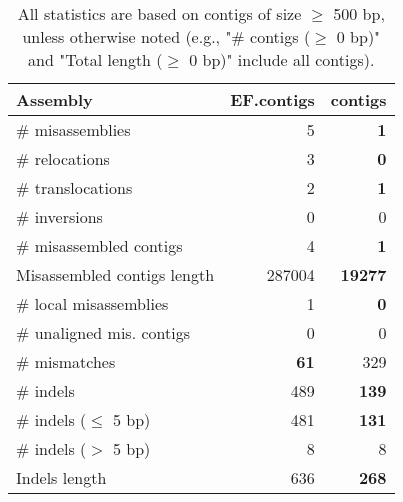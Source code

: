 \documentclass[12pt,a4paper]{article}
\begin{document}
\begin{table}[ht]
\begin{center}
\caption{All statistics are based on contigs of size $\geq$ 500 bp, unless otherwise noted (e.g., "\# contigs ($\geq$ 0 bp)" and "Total length ($\geq$ 0 bp)" include all contigs).}
\begin{tabular}{|l*{2}{|r}|}
\hline
Assembly & EF.contigs & contigs \\ \hline
\# misassemblies & 5 & {\bf 1} \\ \hline
\hspace{5mm}\# relocations & 3 & {\bf 0} \\ \hline
\hspace{5mm}\# translocations & 2 & {\bf 1} \\ \hline
\hspace{5mm}\# inversions & 0 & 0 \\ \hline
\# misassembled contigs & 4 & {\bf 1} \\ \hline
Misassembled contigs length & 287004 & {\bf 19277} \\ \hline
\# local misassemblies & 1 & {\bf 0} \\ \hline
\# unaligned mis. contigs & 0 & 0 \\ \hline
\# mismatches & {\bf 61} & 329 \\ \hline
\# indels & 489 & {\bf 139} \\ \hline
\hspace{5mm}\# indels ($\leq$ 5 bp) & 481 & {\bf 131} \\ \hline
\hspace{5mm}\# indels ($>$ 5 bp) & 8 & 8 \\ \hline
Indels length & 636 & {\bf 268} \\ \hline
\end{tabular}
\end{center}
\end{table}
\end{document}
